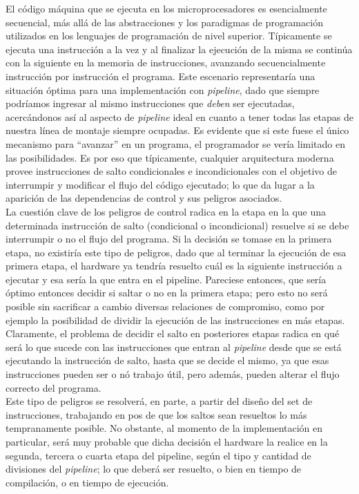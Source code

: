 El código máquina que se ejecuta en los microprocesadores es esencialmente 
secuencial, más allá de las abstracciones y los paradigmas de programación 
utilizados en los lenguajes de programación de nivel superior. Típicamente se 
ejecuta una instrucción a la vez y al finalizar la ejecución de la misma se 
continúa con la siguiente en la memoria de instrucciones, avanzando 
secuencialmente instrucción por instrucción el programa. Este escenario 
representaría una situación óptima para una implementación con \emph{pipeline}, 
dado que siempre podríamos ingresar al mismo instrucciones que \emph{deben} ser 
ejecutadas, acercándonos así al aspecto de \emph{pipeline} ideal en cuanto a 
tener todas las etapas de nuestra línea de montaje siempre ocupadas. Es 
evidente que si este fuese el único mecanismo para ``avanzar'' en un programa, 
el programador se vería limitado en las posibilidades. Es por eso que 
típicamente, cualquier arquitectura moderna provee instrucciones de salto 
condicionales e incondicionales con el objetivo de interrumpir y modificar el 
flujo del código ejecutado; lo que da lugar a la aparición de las dependencias 
de control y sus peligros asociados.\\
La cuestión clave de los peligros de control radica en la etapa en la que una 
determinada instrucción de salto (condicional o incondicional) resuelve si se 
debe interrumpir o no el flujo del programa. Si la decisión se tomase en la 
primera etapa, no existiría este tipo de peligros, dado que al terminar la 
ejecución de esa primera etapa, el hardware ya tendría resuelto cuál es la 
siguiente instrucción a ejecutar y esa sería la que entra en el pipeline. 
Pareciese entonces, que sería óptimo entonces decidir si saltar o no en la 
primera etapa; pero esto no será posible sin sacrificar a cambio diversas 
relaciones de compromiso, como por ejemplo la posibilidad de dividir la 
ejecución de las instrucciones en más etapas. Claramente, el problema de 
decidir el salto en posteriores etapas radica en qué será lo que sucede con 
las instrucciones que entran al \emph{pipeline} desde que se está ejecutando la 
instrucción de salto, hasta que se decide el mismo, ya que esas instrucciones 
pueden ser o nó trabajo útil, pero además, pueden alterar el flujo correcto del 
programa.\\
Este tipo de peligros se resolverá, en parte, a partir del diseño del set de 
instrucciones, trabajando en pos de que los saltos sean resueltos lo más 
tempranamente posible. No obstante, al momento de la implementación en 
particular, será muy probable que dicha decisión el hardware la realice en la 
segunda, tercera o cuarta etapa del pipeline, según el tipo y cantidad de 
divisiones del \emph{pipeline}; lo que deberá ser resuelto, o bien en tiempo de 
compilación, o en tiempo de ejecución.

